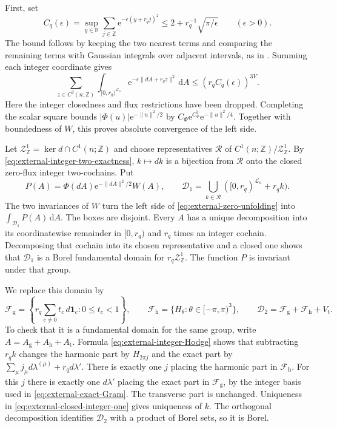 \documentclass[11pt,letterpaper,reqno]{amsart}
\newcommand{\R}{\mathbb R}
\newcommand{\Z}{\mathbb Z}
\newcommand{\dd}{\mathrm d}
\begin{document}
First, set
\[
 C_q(\epsilon)=\sup_{y\in\R}\sum_{j\in\Z}
                  \mathrm e^{-\epsilon(y+r_qj)^2}
       \le2+r_q^{-1}\sqrt{\pi/\epsilon}\qquad(\epsilon>0).
\]
The bound follows by keeping the two nearest terms and comparing
the remaining terms with Gaussian integrals over adjacent intervals,
as in \cite[(5)]{ChamberLattice}. Summing each integer coordinate gives
\[
 \sum_{z\in C^2(n;\Z)}\int_{[0,r_q)^{\mathcal L_n}}
              \mathrm e^{-\epsilon\|dA+r_qz\|^2}\,\dd A
                     \le(r_qC_q(\epsilon))^{3V}.
\]
Here the integer closedness and flux restrictions have
been dropped. Completing the scalar square bounds
$|\Phi(u)|\mathrm e^{-\|u\|^2/2}$ by
$C_\Phi \mathrm e^{C_\Phi^2}\mathrm e^{-\|u\|^2/4}$.
Together with boundedness of $W$, this proves absolute
convergence of the left side.

Let $\mathcal Z^1_{\Z}=\ker d\cap C^1(n;\Z)$ and
choose representatives $\mathcal R$ of
$C^1(n;\Z)/\mathcal Z^1_{\Z}$. By
\eqref{eq:external-integer-two-exactness}, $k\mapsto dk$
is a bijection from $\mathcal R$ onto the closed
zero-flux integer two-cochains. Put
\[
 P(A)=\Phi(dA)\mathrm e^{-\|dA\|^2/2}W(A),\qquad
 \mathcal D_1=\bigcup_{k\in\mathcal R}
                     ([0,r_q)^{\mathcal L_n}+r_qk).
\]
The two invariances of $W$ turn the left side of
\eqref{eq:external-zero-unfolding} into
$\int_{\mathcal D_1}P(A)\,\dd A$.
The boxes are disjoint. Every $A$ has a unique decomposition
into its coordinatewise remainder in $[0,r_q)$ and
$r_q$ times an integer cochain. Decomposing that cochain
into its chosen representative and a closed one shows
that $\mathcal D_1$ is a Borel fundamental domain for
$r_q\mathcal Z^1_{\Z}$. The function $P$ is invariant
under that group.

We replace this domain by
\[
 \mathcal F_{\mathrm g}
 =\left\{r_q\sum_{c\ne0}t_c\,d\mathbf1_c:0\le t_c<1\right\},
 \qquad
 \mathcal F_{\mathrm h}=\{H_\theta:\theta\in[-\pi,\pi)^3\},
 \qquad
 \mathcal D_2=\mathcal F_{\mathrm g}+\mathcal F_{\mathrm h}
                                      +V_{\mathrm t}.
\]
To check that it is a fundamental domain for the same
group, write $A=A_{\mathrm g}+A_{\mathrm h}+A_{\mathrm t}$.
Formula \eqref{eq:external-integer-Hodge} shows that
subtracting $r_qk$ changes the harmonic part by
$H_{2\pi j}$ and the exact part by
$\sum_\mu j_\mu d\lambda^{(\mu)}+r_qd\lambda'$.
There is exactly one $j$ placing the harmonic part
in $\mathcal F_{\mathrm h}$. For this $j$ there is
exactly one $d\lambda'$ placing the exact part
in $\mathcal F_{\mathrm g}$, by the integer basis
used in \eqref{eq:external-exact-Gram}. The transverse
part is unchanged. Uniqueness in
\eqref{eq:external-closed-integer-one} gives uniqueness
of $k$. The orthogonal decomposition identifies
$\mathcal D_2$ with a product of Borel sets, so it
is Borel.
\end{document}
